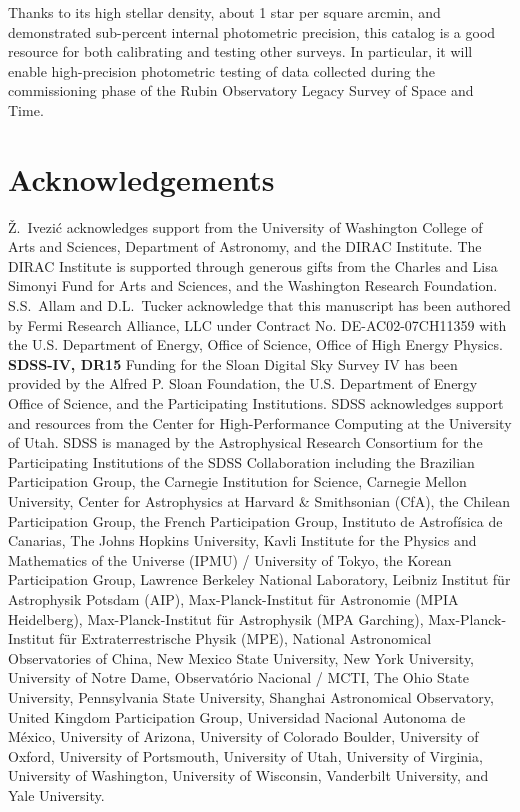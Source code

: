 \documentclass[fleqn,usenatbib]{mnras}
\begin{document}
Thanks to its high stellar density, about 1 star per square arcmin, and demonstrated sub-percent 
internal photometric precision, this catalog is a good resource for both calibrating and testing 
other surveys. In particular, it will enable high-precision photometric testing of data collected 
during the commissioning phase of the Rubin Observatory Legacy Survey of Space and Time. 

\newpage

\section*{Acknowledgements}
\v{Z}.~Ivezi\'{c} acknowledges support from the University of Washington College of Arts and Sciences, Department of Astronomy, and the DIRAC Institute. The DIRAC Institute is supported through generous gifts from the Charles and Lisa Simonyi Fund for Arts and Sciences, and the Washington Research Foundation. S.S.~Allam and D.L.~Tucker acknowledge that this manuscript has been authored by Fermi Research Alliance, LLC under Contract No. DE-AC02-07CH11359 with the U.S. Department of Energy, Office of Science, Office of High Energy Physics.\\
{\bf SDSS-IV, DR15} Funding for the Sloan Digital Sky Survey IV has been provided by the Alfred P. Sloan Foundation, the U.S. Department of Energy Office of Science, and the Participating Institutions. SDSS acknowledges support and resources from the Center for High-Performance Computing at the University of Utah. SDSS is managed by the Astrophysical Research Consortium for the Participating Institutions of the SDSS Collaboration including the Brazilian Participation Group, the Carnegie Institution for Science, Carnegie Mellon University, Center for Astrophysics at Harvard \& Smithsonian (CfA), the Chilean Participation Group, the French Participation Group, Instituto de Astrof{\'i}sica de Canarias, The Johns Hopkins University, Kavli Institute for the Physics and Mathematics of the Universe (IPMU) / University of Tokyo, the Korean Participation Group, Lawrence Berkeley National Laboratory, Leibniz Institut f{\"u}r Astrophysik Potsdam (AIP), Max-Planck-Institut f{\"u}r Astronomie (MPIA Heidelberg), Max-Planck-Institut f{\"u}r Astrophysik (MPA Garching), Max-Planck-Institut f{\"u}r Extraterrestrische Physik (MPE), National Astronomical Observatories of China, New Mexico State University, New York University, University of Notre Dame, Observat{\'o}rio Nacional / MCTI, The Ohio State University, Pennsylvania State University, Shanghai Astronomical Observatory, United Kingdom Participation Group, Universidad Nacional Autonoma de M{\'e}xico, University of Arizona, University of Colorado Boulder, University of Oxford, University of Portsmouth, University of Utah, University of Virginia, University of Washington, University of Wisconsin, Vanderbilt University, and Yale University. \\
\end{document}
